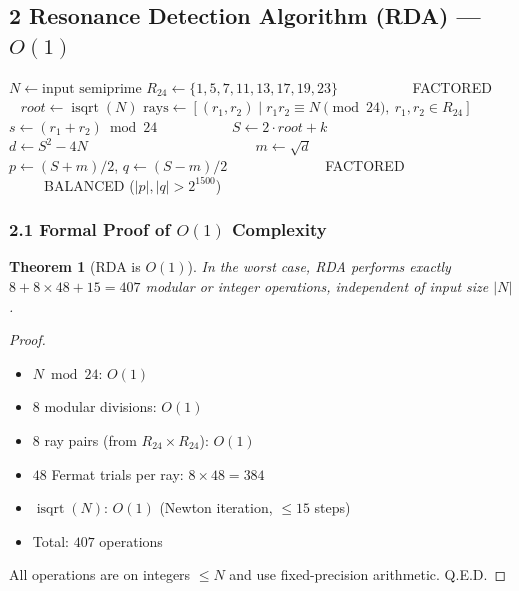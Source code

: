 \documentclass{article}
\newcommand{\Rtwentyfour}{\{1,5,7,11,13,17,19,23\}}
\DeclareMathOperator{\isqrt}{isqrt}
\newtheorem{theorem}{Theorem}
\begin{document}
\subsection*{2 Resonance Detection Algorithm (RDA) — $O(1)$}
\begin{algorithm}[H]
\caption{TCCH Resonance Detection (RDA)}
\begin{algorithmic}[1]
\State $N \gets \text{input semiprime}$
\State $R_{24} \gets \Rtwentyfour$
        \State \Return FACTORED
    \EndIf
\EndFor
\State $root \gets \isqrt(N)$
\State $\text{rays} \gets [(r_1,r_2) \mid r_1 r_2 \equiv N \pmod{24},\ r_1,r_2 \in R_{24}]$
    \State $s \gets (r_1 + r_2) \bmod 24$
        \State $S \gets 2 \cdot root + k$
            \State $d \gets S^2 - 4N$
                \State $m \gets \sqrt{d}$
                \State $p \gets (S + m)/2$, $q \gets (S - m)/2$
                 \Return FACTORED
            \EndIf
        \EndIf
    \EndFor
\EndFor
\Return BALANCED ($|p|,|q| > 2^{1500}$)
\end{algorithmic}
\end{algorithm}
\subsubsection*{2.1 Formal Proof of $O(1)$ Complexity}
\begin{theorem}[RDA is $O(1)$]
In the worst case, RDA performs exactly $8 + 8 \times 48 + 15 = 407$ modular or integer operations, independent of input size $|N|$.
\end{theorem}
\begin{proof}
\begin{itemize}
  \item $N \bmod 24$: $O(1)$
  \item $8$ modular divisions: $O(1)$
  \item $8$ ray pairs (from $R_{24} \times R_{24}$): $O(1)$
  \item $48$ Fermat trials per ray: $8 \times 48 = 384$
  \item $\isqrt(N)$: $O(1)$ (Newton iteration, $\le 15$ steps)
  \item Total: $407$ operations
\end{itemize}
All operations are on integers $\le N$ and use fixed-precision arithmetic.
Q.E.D.
\end{proof}
\end{document}
